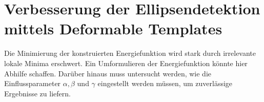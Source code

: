 \section{Verbesserung der Ellipsendetektion mittels Deformable Templates}
Die Minimierung der konstruierten Energiefunktion wird stark durch irrelevante lokale Minima erschwert. Ein Umformulieren der Energiefunktion könnte hier Abhilfe schaffen. 
Darüber hinaus muss untersucht werden, wie die Einflussparameter $\alpha,\beta$ und $\gamma$ eingestellt werden müssen, um zuverlässige Ergebnisse zu liefern. 









